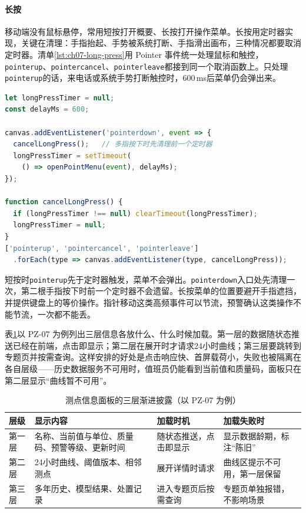\paragraph{长按}移动端没有鼠标悬停，常用短按打开概要、长按打开操作菜单。长按用定时器实现，关键在清理：手指抬起、手势被系统打断、手指滑出画布，三种情况都要取消定时器。清单\ref{lst:ch07-long-press}用 Pointer 事件统一处理鼠标和触控，\texttt{pointerup}、\texttt{pointercancel}、\texttt{pointerleave}都接到同一个取消函数上。只处理\texttt{pointerup}的话，来电话或系统手势打断触控时，600\,ms后菜单仍会弹出来。

\begin{lstlisting}[label={lst:ch07-long-press},language=JavaScript,caption={触控长按的定时器与取消}]
let longPressTimer = null;
const delayMs = 600;

canvas.addEventListener('pointerdown', event => {
  cancelLongPress();   // 多指按下时先清理前一个定时器
  longPressTimer = setTimeout(
    () => openPointMenu(event), delayMs);
});

function cancelLongPress() {
  if (longPressTimer !== null) clearTimeout(longPressTimer);
  longPressTimer = null;
}
['pointerup', 'pointercancel', 'pointerleave']
  .forEach(type => canvas.addEventListener(type, cancelLongPress));
\end{lstlisting}

短按时\texttt{pointerup}先于定时器触发，菜单不会弹出。\texttt{pointerdown}入口处先清理一次，第二根手指按下时前一个定时器不会遗留。长按菜单的位置要避开手指遮挡，并提供键盘上的等价操作。指针移动这类高频事件可以节流，预警确认这类操作不能节流，一次都不能丢。

表\ref{tab:ch07-panel-layers}以 PZ-07 为例列出三层信息各放什么、什么时候加载。第一层的数据随状态推送已经在前端，点击即显示；第二层在展开时才请求24小时曲线；第三层要跳转到专题页并按需查询。这样安排的好处是点击响应快、首屏载荷小，失败也被隔离在各自层级——历史数据服务不可用时，值班员仍能看到当前值和质量码，面板只在第二层显示“曲线暂不可用”。

\begin{table}[htbp]
\centering
\caption{测点信息面板的三层渐进披露（以 PZ-07 为例）}
\label{tab:ch07-panel-layers}
\begin{tabular}{p{1.8cm}p{4.6cm}p{2.8cm}p{3.4cm}}
\toprule
层级 & 显示内容 & 加载时机 & 加载失败时 \\
\midrule
第一层 & 名称、当前值与单位、质量码、预警等级、更新时间 & 随状态推送，点击即显示 & 显示数据龄期，标注“陈旧” \\
第二层 & 24小时曲线、阈值版本、相邻测点 & 展开详情时请求 & 曲线区提示不可用，第一层保留 \\
第三层 & 多年历史、模型结果、处置记录 & 进入专题页后按需查询 & 专题页单独报错，不影响场景 \\
\bottomrule
\end{tabular}
\end{table}

